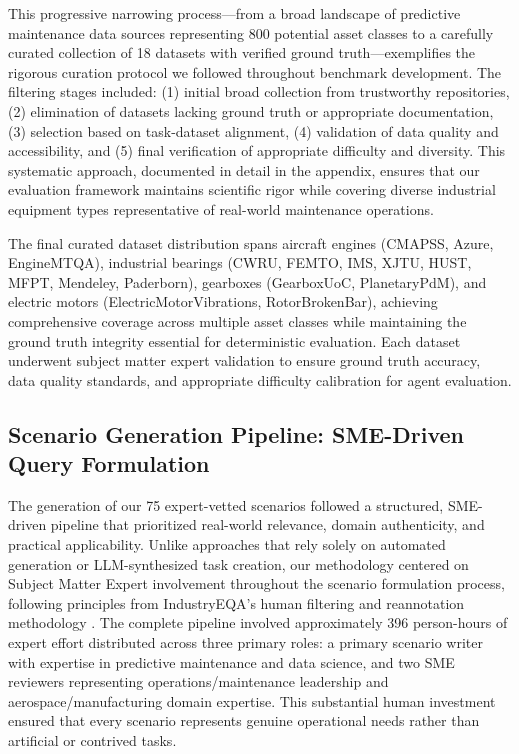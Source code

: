 \documentclass[conference]{IEEEtran}
\begin{document}
This progressive narrowing process—from a broad landscape of predictive maintenance data sources representing 800 potential asset classes to a carefully curated collection of 18 datasets with verified ground truth—exemplifies the rigorous curation protocol we followed throughout benchmark development. The filtering stages included: (1) initial broad collection from trustworthy repositories, (2) elimination of datasets lacking ground truth or appropriate documentation, (3) selection based on task-dataset alignment, (4) validation of data quality and accessibility, and (5) final verification of appropriate difficulty and diversity. This systematic approach, documented in detail in the appendix, ensures that our evaluation framework maintains scientific rigor while covering diverse industrial equipment types representative of real-world maintenance operations.

The final curated dataset distribution spans aircraft engines (CMAPSS, Azure, EngineMTQA), industrial bearings (CWRU, FEMTO, IMS, XJTU, HUST, MFPT, Mendeley, Paderborn), gearboxes (GearboxUoC, PlanetaryPdM), and electric motors (ElectricMotorVibrations, RotorBrokenBar), achieving comprehensive coverage across multiple asset classes while maintaining the ground truth integrity essential for deterministic evaluation. Each dataset underwent subject matter expert validation to ensure ground truth accuracy, data quality standards, and appropriate difficulty calibration for agent evaluation.

\subsection{Scenario Generation Pipeline: SME-Driven Query Formulation}

The generation of our 75 expert-vetted scenarios followed a structured, SME-driven pipeline that prioritized real-world relevance, domain authenticity, and practical applicability. Unlike approaches that rely solely on automated generation or LLM-synthesized task creation, our methodology centered on Subject Matter Expert involvement throughout the scenario formulation process, following principles from IndustryEQA's human filtering and reannotation methodology \cite{industryeqa2024}. The complete pipeline involved approximately 396 person-hours of expert effort distributed across three primary roles: a primary scenario writer with expertise in predictive maintenance and data science, and two SME reviewers representing operations/maintenance leadership and aerospace/manufacturing domain expertise. This substantial human investment ensured that every scenario represents genuine operational needs rather than artificial or contrived tasks.
\end{document}
